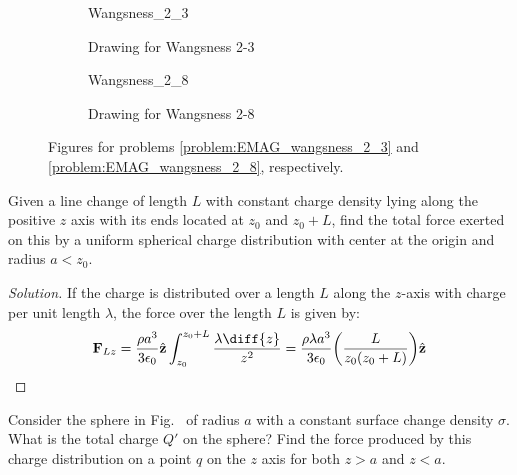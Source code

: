 \documentclass[crop=false,class=article,oneside]{standalone}
\begin{document}
    \begin{figure}[H]
        \centering
        \captionsetup{type=figure}
        \begin{subfigure}[b]{0.49\textwidth}
            \centering
            \captionsetup{type=figure}
            {Wangsness_2_3}
            \caption{Drawing for Wangsness 2-3}
            \label{fig:EMAG_1_Wangsness_2_3}
        \end{subfigure}
        \begin{subfigure}[b]{0.49\textwidth}
            \centering
            \captionsetup{type=figure}
            {Wangsness_2_8}
            \caption{Drawing for Wangsness 2-8}
            \label{fig:EMAG_1_wangsness_2_8}
        \end{subfigure}
        \caption[Figures for Wangsness 2-3 and 2-8]{%
            Figures for problems \ref{problem:EMAG_wangsness_2_3}
            and \ref{problem:EMAG_wangsness_2_8}, respectively.
        }
    \end{figure}
    \begin{problem}[Wangsness 2-7]
        Given a line change of length $L$ with constant charge
        density lying along the positive $z$ axis with its
        ends located at $z_{0}$ and $z_{0}+L$, find the total
        force exerted on this by a uniform spherical charge
        distribution with center at the origin
        and radius $a<z_{0}$.
    \end{problem}
    \begin{proof}[Solution]
        If the charge is distributed over a length $L$
        along the $z$-axis with charge per unit length $\lambda$,
        the force over the length $L$ is given by:
        \begin{equation*}
            \mathbf{F}_{Lz}
            =\frac{\rho a^{3}}{3\epsilon_{0}}\hat{\mathbf{z}}
            \int_{z_{0}}^{z_{0}+L}\frac{\lambda\diff{z}}{z^{2}}
            =\frac{\rho\lambda{a^{3}}}{3\epsilon_{0}}
            \bigg(\frac{L}{z_{0}(z_{0}+L)}\bigg)
            \hat{\mathbf{z}}
        \end{equation*}
    \end{proof}
    \begin{problem}[Wangsness 2-8]
        \label{problem:EMAG_wangsness_2_8}
        Consider the sphere in
        Fig.~
        of radius $a$ with a constant surface change density
        $\sigma$. What is the total charge $Q'$ on the sphere?
        Find the force produced by this charge distribution on a
        point $q$ on the $z$ axis for both $z>a$ and $z<a$.
    \end{problem}
\end{document}
